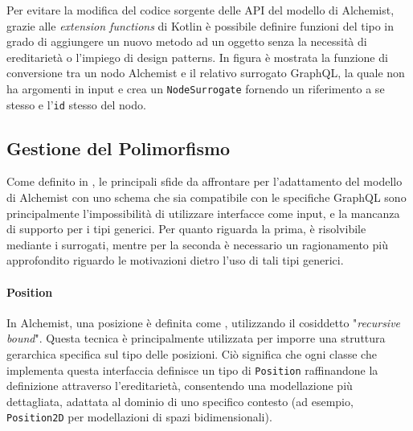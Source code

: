 
Per evitare la modifica del codice sorgente delle \ac{API} del modello di Alchemist, grazie alle \textit{extension functions} di Kotlin è possibile
definire funzioni del tipo  in grado di aggiungere un nuovo metodo ad un oggetto senza la necessità di ereditarietà
o l'impiego di design patterns. In figura  è mostrata la funzione di conversione tra un nodo Alchemist e il relativo
surrogato GraphQL, la quale non ha argomenti in input e crea un \texttt{NodeSurrogate} fornendo un riferimento a se stesso e l'\texttt{id} stesso del nodo.


\subsection{Gestione del Polimorfismo}\label{ssec:generics-serialize}
Come definito in , le principali sfide da affrontare per l'adattamento del modello di Alchemist con uno schema che sia
compatibile con le specifiche GraphQL sono principalmente l'impossibilità di utilizzare interfacce come input, e la mancanza di supporto per i tipi generici.
Per quanto riguarda la prima, è risolvibile mediante i surrogati, mentre per la seconda è necessario un ragionamento più approfondito riguardo le motivazioni
dietro l'uso di tali tipi generici.

\paragraph{Position}
In Alchemist, una posizione è definita come , utilizzando il cosiddetto "\textit{recursive bound}". Questa tecnica è
principalmente utilizzata per imporre una struttura gerarchica specifica sul tipo delle posizioni. Ciò significa che ogni classe che implementa questa
interfaccia definisce un tipo di \texttt{Position} raffinandone la definizione attraverso l'ereditarietà, consentendo una modellazione più dettagliata,
adattata al dominio di uno specifico contesto (ad esempio, \texttt{Position2D} per modellazioni di spazi bidimensionali).

